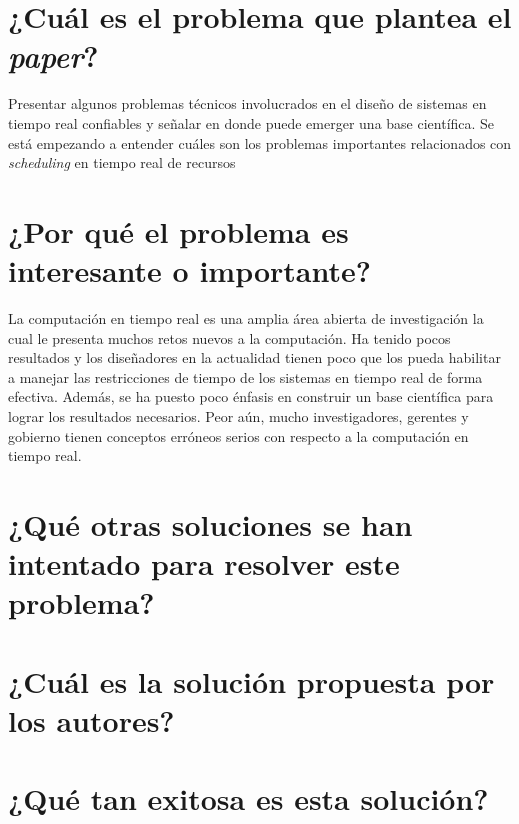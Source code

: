 \section{¿Cuál es el problema que plantea el \textit{paper}?}
Presentar algunos problemas técnicos involucrados en el diseño de sistemas en tiempo real confiables y señalar en donde puede emerger una base científica. Se está empezando a entender cuáles son los problemas importantes relacionados con \emph{scheduling} en tiempo real de recursos

\section{¿Por qué el problema es interesante o importante?}
La computación en tiempo real es una amplia área abierta de investigación la cual le presenta muchos retos nuevos a la computación. Ha tenido pocos resultados y los diseñadores en la actualidad tienen poco que los pueda habilitar a manejar las restricciones de tiempo de los sistemas en tiempo real de forma efectiva. Además, se ha puesto poco énfasis en construir un base científica para lograr los resultados necesarios. Peor aún, mucho investigadores, gerentes y gobierno tienen conceptos erróneos serios con respecto a la computación en tiempo real.

\section{¿Qué otras soluciones se han intentado para resolver este problema?}

     
\section{¿Cuál es la solución propuesta por los autores?}

\section{¿Qué tan exitosa es esta solución?} 
